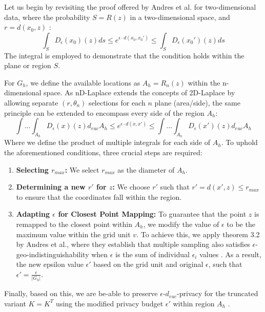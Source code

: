Let us begin by revisiting the proof offered by Andres et al. for two-dimensional data, 
where the probability $S = R(z)$ in a two-dimensional space, and $r = d(x_0, z)$ \citep{DBLP:journals/corr/abs-1212-1984}:
\begin{equation}
     \int_{S} D_\epsilon(x_0)(z)ds \leq e^{\epsilon \cdot d(x_0, x_0')} \leq \int_{S} D_\epsilon(x_0')(z)ds
\end{equation}
The integral is employed to demonstrate that the condition holds within the plane or region $S$.

For $G_h$, we define the available locations as $A_h = R_n(z)$ within the n-dimensional space. As nD-Laplace extends the concepts of 2D-Laplace by allowing separate $(r, \theta_n)$ selections for each $n$ plane (area/side), the same principle can be extended to encompass every side of the region $A_h$:
\begin{equation}
    \int ... \int_{A_h} D_{\epsilon}(x)(z)d_{euc}A_h \leq e^{\epsilon \cdot d(x, x')} \leq \int ... \int_{A_h} D_{\epsilon}(x')(z)d_{euc}A_h
\end{equation}
Where we define the product of multiple integrals for each side of $A_h$.
To uphold the aforementioned conditions, three crucial steps are required:
\begin{enumerate}
\item \textbf{Selecting $r_{max}$:} We select $r_{max}$ as the diameter of $A_h$.
\item \textbf{Determining a new $r'$ for $z$:} We choose $r'$ such that $r' = d(x', z) \leq r_{max}$ to ensure that the coordinates fall within the region.
\item \textbf{Adapting $\epsilon$ for Closest Point Mapping: }To guarantee that the point $z$ is remapped to the closest point within $A_h$, we modify the value of $\epsilon$ to be the maximum value within the grid unit $v$. To achieve this, we apply theorem 3.2 by Andres et al., where they establish that multiple sampling also satisfies $\epsilon$-geo-indistinguishability when $\epsilon$ is the sum of individual $\epsilon_i$ values \citep{DBLP:journals/corr/abs-1212-1984}. As a result, the new epsilon value $\epsilon'$ based on the grid unit and original $\epsilon$, such that $\epsilon' = \frac{\epsilon}{|G_h|}$.
\end{enumerate}
Finally, based on this, we are be-able to preserve $\epsilon$-$d_{euc}$-privacy for the truncated variant $K = K^T$ using the modified privacy budget $\epsilon'$ within region $A_h$ \citep{9646489, DBLP:journals/corr/abs-1212-1984}.
